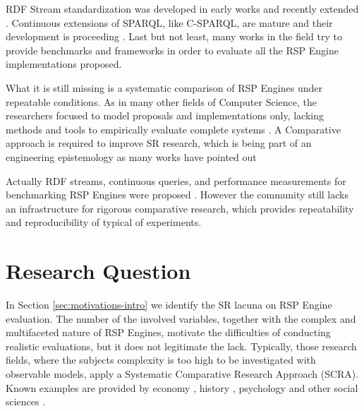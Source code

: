 RDF Stream standardization was developed in early works \cite{DBLP:journals/expert/ValleCHF09, Lephuoc2011} and recently extended \cite{DBLP:conf/semweb/BalduiniVDTPC13}. Continuous extensions of SPARQL, like C-SPARQL, are mature and their development is proceeding \cite{Barbieri2010}. Last but not least, many works in the field  \cite{Zhang2012,LePhuoc2012c}  try to provide benchmarks and frameworks in order to evaluate all the RSP Engine implementations proposed. 

What it is still missing is a systematic comparison of RSP Engines under repeatable conditions. As in many other fields of Computer Science, the researchers focused to model proposals and implementations only, lacking methods and tools to empirically evaluate complete systems \cite{Perry:2000:ESS:336512.336586}. A Comparative approach is required to improve SR research, which is being part of an engineering epistemology as many works have pointed out \cite{Tichy:1995:EEC:209090.209093,Wainer:2009:EEC:1518331.1518552}

Actually RDF streams, continuous queries, and performance measurements for benchmarking RSP Engines were proposed \cite{LePhuoc2012c,Zhang2012, DBLP:conf/semweb/DellAglioCBCV13}. However the community still lacks an infrastructure for rigorous comparative research, which provides repeatability and reproducibility of typical of experiments.


\section{Research Question}\label{sec:research-question-intro}

In Section \ref{sec:motivations-intro} we identify the SR lacuna on RSP Engine evaluation. The number of the involved variables, together with the complex and multifaceted nature of RSP Engines, motivate the difficulties of conducting realistic evaluations, but it does not legitimate the lack. Typically, those research fields, where the subjects complexity is too high to be investigated with observable models, apply a Systematic Comparative Research Approach (SCRA). Known examples are provided by economy \cite{CBO9781139174053A009}, history \cite{CSS:4411600}, psychology and other social sciences \cite{felsenstein1985phylogenies}.

